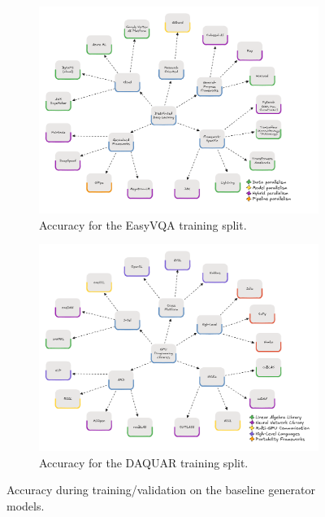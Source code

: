 \begin{figure}
	\centering
	\begin{subfigure}{0.48\linewidth}
		\includegraphics[width=\textwidth]{figures/mindmap}
		\caption{Accuracy for the EasyVQA training split.}
		\label{fig:base-a}
	\end{subfigure}
	\hfill
	\begin{subfigure}{0.48\linewidth}
		\includegraphics[width=\textwidth]{figures/mindmap-cuda}
		\caption{Accuracy for the DAQUAR training split.}
		\label{fig:base-b}
	\end{subfigure}
	\caption{Accuracy during training/validation on the baseline generator models.}
	\label{fig:base}
\end{figure}

